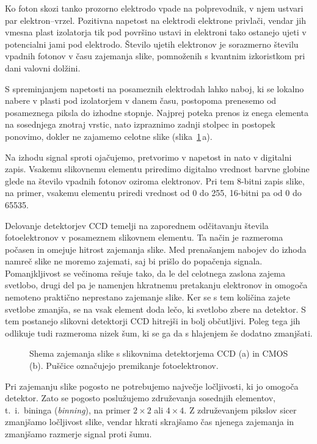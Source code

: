 Ko foton skozi tanko prozorno elektrodo vpade na polprevodnik, v njem ustvari
par elektron--vrzel. Pozitivna napetost na elektrodi elektrone privlači, vendar jih 
vmesna plast izolatorja tik pod površino ustavi in elektroni tako ostanejo ujeti v potencialni jami
pod elektrodo. Število ujetih elektronov je sorazmerno številu vpadnih fotonov v času zajemanja slike, 
pomnoženih s kvantnim izkoristkom pri dani valovni dolžini. 

S spreminjanjem napetosti na posameznih elektrodah lahko naboj, ki se lokalno nabere 
v plasti pod izolatorjem v danem času, postopoma prenesemo od posameznega 
piksla do izhodne stopnje. Najprej poteka prenos iz enega elementa na sosednjega znotraj vrstic, 
nato izpraznimo zadnji stolpec in postopek ponovimo, dokler ne zajamemo celotne slike 
(slika~\ref{11_CCD}\,a). 

Na izhodu signal sproti ojačujemo, 
pretvorimo v napetost in nato  v digitalni zapis. Vsakemu slikovnemu elementu priredimo
digitalno vrednost barvne globine glede na število vpadnih fotonov oziroma elektronov. Pri tem
8-bitni zapis slike, na primer, vsakemu elementu priredi vrednost od 0 do 255, 16-bitni pa od 0 do 65535.

Delovanje detektorjev CCD temelji na zaporednem odčitavanju števila fotoelektronov v posameznem 
slikovnem elementu. Ta način je razmeroma počasen in omejuje hitrost zajemanja slike. Med 
prenašanjem nabojev do izhoda namreč slike ne moremo zajemati, saj bi prišlo do popačenja signala. 
Pomanjkljivost se večinoma rešuje tako, da le del celotnega zaslona zajema svetlobo, drugi del
pa je namenjen hkratnemu pretakanju elektronov in omogoča nemoteno praktično neprestano zajemanje slike.
Ker se s tem količina zajete svetlobe zmanjša, se na vsak element doda lečo, ki svetlobo zbere
na detektor. S tem postanejo slikovni detektorji CCD hitrejši in bolj občutljivi. Poleg
tega jih odlikuje tudi razmeroma nizek šum, ki se ga da s hlajenjem še dodatno 
zmanjšati. 

\begin{figure}[h]
\centering
\def\svgwidth{100truemm} 

\caption{Shema zajemanja slike s slikovnima detektorjema CCD (a) in  CMOS (b). Puščice označujejo premikanje
fotoelektronov.}
\label{11_CCD}
\end{figure}

\begin{remark}
Pri zajemanju slike pogosto ne potrebujemo največje ločljivosti, ki jo omogoča detektor. 
Zato se pogosto poslužujemo združevanja sosednjih elementov, t.\ i.\ bininga ({\it binning}), 
na primer $2\times2$ ali $4\times4$. Z združevanjem pikslov sicer zmanjšamo ločljivost slike, 
vendar hkrati skrajšamo čas njenega zajemanja in zmanjšamo razmerje signal proti šumu. 
\end{remark}

